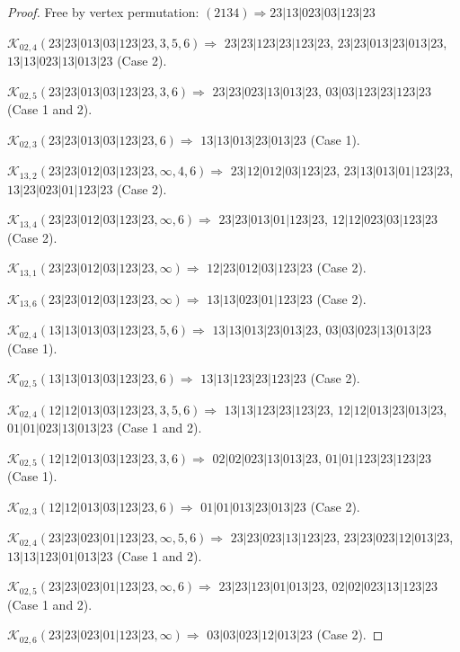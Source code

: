 \documentclass[12pt]{article}
\theoremstyle{plain}
\theoremstyle{definition}
\theoremstyle{remark}
\newcommand{\fancy}[1]{\mathcal{#1}}
\def\K{\fancy{K}}
\begin{document}
\begin{proof}
	
	
	Free by vertex permutation: $(2 1 3 4)\Rightarrow 23|13|023|03|123|23$
	
	
	
	\bigskip
	
	$\K_{02,4}(23|23|013|03|123|23,3, 5, 6)\Rightarrow $ $23|23|123|23|123|23$, $23|23|013|23|013|23$, $13|13|023|13|013|23$ (Case 2).
	
	$\K_{02,5}(23|23|013|03|123|23,3, 6)\Rightarrow $ $23|23|023|13|013|23$, $03|03|123|23|123|23$ (Case 1 and 2).
	
	$\K_{02,3}(23|23|013|03|123|23,6)\Rightarrow $ $13|13|013|23|013|23$ (Case 1).
	
	
	\bigskip
	
	$\K_{13,2}(23|23|012|03|123|23,\infty,4, 6)\Rightarrow $ $23|12|012|03|123|23$, $23|13|013|01|123|23$, $13|23|023|01|123|23$ (Case 2).
	
	$\K_{13,4}(23|23|012|03|123|23,\infty,6)\Rightarrow $ $23|23|013|01|123|23$, $12|12|023|03|123|23$ (Case 2).
	
	$\K_{13,1}(23|23|012|03|123|23,\infty)\Rightarrow $ $12|23|012|03|123|23$ (Case 2).
	
	$\K_{13,6}(23|23|012|03|123|23,\infty)\Rightarrow $ $13|13|023|01|123|23$ (Case 2).
	
	
	\bigskip
	
	$\K_{02,4}(13|13|013|03|123|23,5, 6)\Rightarrow $ $13|13|013|23|013|23$, $03|03|023|13|013|23$ (Case 1).
	
	$\K_{02,5}(13|13|013|03|123|23,6)\Rightarrow $ $13|13|123|23|123|23$ (Case 2).
	
	
	\bigskip
	
	$\K_{02,4}(12|12|013|03|123|23,3, 5, 6)\Rightarrow $ $13|13|123|23|123|23$, $12|12|013|23|013|23$, $01|01|023|13|013|23$ (Case 1 and 2).
	
	$\K_{02,5}(12|12|013|03|123|23,3, 6)\Rightarrow $ $02|02|023|13|013|23$, $01|01|123|23|123|23$ (Case 1).
	
	$\K_{02,3}(12|12|013|03|123|23,6)\Rightarrow $ $01|01|013|23|013|23$ (Case 2).
	
	
	\bigskip
	
	$\K_{02,4}(23|23|023|01|123|23,\infty,5, 6)\Rightarrow $ $23|23|023|13|123|23$, $23|23|023|12|013|23$, $13|13|123|01|013|23$ (Case 1 and 2).
	
	$\K_{02,5}(23|23|023|01|123|23,\infty,6)\Rightarrow $ $23|23|123|01|013|23$, $02|02|023|13|123|23$ (Case 1 and 2).
	
	$\K_{02,6}(23|23|023|01|123|23,\infty)\Rightarrow $ $03|03|023|12|013|23$ (Case 2).
	

\end{proof}
\end{document}
